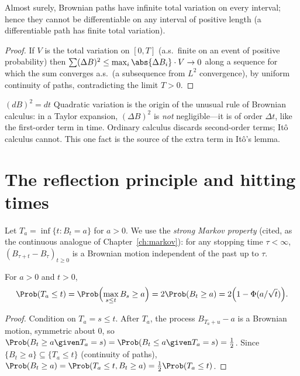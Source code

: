 \begin{corollary}
Almost surely, Brownian paths have infinite total variation on every interval; hence they
cannot be differentiable on any interval of positive length (a differentiable path has
finite total variation).
\end{corollary}
\begin{proof}
If $V$ is the total variation on $[0,T]$ (a.s.\ finite on an event of positive
probability) then
$\sum(\Delta B)^2\le\max_i\abs{\Delta B_i}\cdot V\to0$ along a sequence for which the
sum converges a.s.\ (a subsequence from $L^2$ convergence), by uniform continuity of
paths, contradicting the limit $T>0$.
\end{proof}

\begin{nuance}{$(dB)^2=dt$}
Quadratic variation is the origin of the unusual rule of Brownian calculus:
in a Taylor expansion, $(\Delta B)^2$ is \emph{not} negligible---it is of order $\Delta t$,
like the first-order term in time. Ordinary calculus discards second-order terms; It\^o calculus
cannot. This one fact is the source of the extra term in It\^o's lemma.
\end{nuance}

\section{The reflection principle and hitting times}

Let $T_a=\inf\{t:B_t=a\}$ for $a>0$. We use the \emph{strong Markov property}
(cited, as the continuous analogue of Chapter~\ref{ch:markov}): for any stopping time
$\tau<\infty$, $(B_{\tau+t}-B_\tau)_{t\ge0}$ is a Brownian motion independent of
the past up to $\tau$.

\begin{theorem}\label{thm:bmreflect}
For $a>0$ and $t>0$,
\[
\Prob(T_a\le t)=\Prob\Bigl(\max_{s\le t}B_s\ge a\Bigr)=2\Prob(B_t\ge a)=2\Bigl(1-\Phi(a/\sqrt t)\Bigr).
\]
\end{theorem}
\begin{proof}
Condition on $T_a=s\le t$. After $T_a$, the process $B_{T_a+u}-a$ is a Brownian motion,
symmetric about $0$, so $\Prob(B_t\ge a\given T_a=s)=\Prob(B_t\le a\given T_a=s)=\tfrac12$.
Since $\{B_t\ge a\}\subseteq\{T_a\le t\}$ (continuity of paths),
$\Prob(B_t\ge a)=\Prob(T_a\le t,B_t\ge a)=\tfrac12\Prob(T_a\le t)$.
\end{proof}

